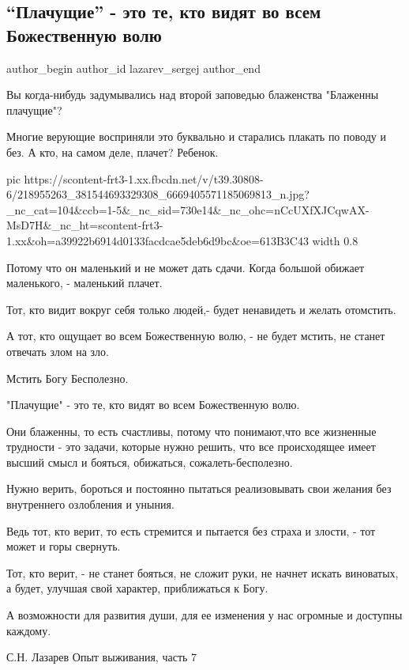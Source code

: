  
 
 
 
 
 
\subsection{\enquote{Плачущие} - это те, кто видят во всем Божественную волю}
\label{sec:04_09_2021.fb.lazarev_sergej.1.plachuschije_zapoved}
 
\ifcmt
 author_begin
   author_id lazarev_sergej
 author_end
\fi

Вы когда-нибудь задумывались над второй заповедью блаженства "Блаженны
плачущие"?

Многие верующие восприняли это буквально и старались плакать по поводу и без. А
кто, на самом деле, плачет? Ребенок.

\ifcmt
  pic https://scontent-frt3-1.xx.fbcdn.net/v/t39.30808-6/218955263_381544693329308_6669405571185069813_n.jpg?_nc_cat=104&ccb=1-5&_nc_sid=730e14&_nc_ohc=nCcUXfXJCqwAX-MsD7H&_nc_ht=scontent-frt3-1.xx&oh=a39922b6914d0133facdcae5deb6d9bc&oe=613B3C43
  width 0.8
\fi

Потому что он маленький и не может дать сдачи. Когда большой обижает
маленького, - маленький плачет.

Тот, кто видит вокруг себя только людей,- будет ненавидеть и желать отомстить.

А тот, кто ощущает во всем Божественную волю, - не будет мстить, не станет
отвечать злом на зло.

Мстить Богу Бесполезно.

"Плачущие" - это те, кто видят во всем Божественную волю.

Они блаженны, то есть счастливы, потому что понимают,что все жизненные
трудности - это задачи, которые нужно решить, что все происходящее имеет высший
смысл и бояться, обижаться, сожалеть-бесполезно.

Нужно верить, бороться и постоянно пытаться реализовывать свои желания без
внутреннего озлобления и уныния.

Ведь тот, кто верит, то есть стремится и пытается без страха и злости, - тот
может и горы свернуть.

Тот, кто верит, - не станет бояться, не сложит руки, не начнет искать
виноватых, а будет, улучшая свой характер, приближаться к Богу.

А возможности для развития души, для ее изменения у нас огромные и доступны
каждому.

С.Н. Лазарев Опыт выживания, часть 7
